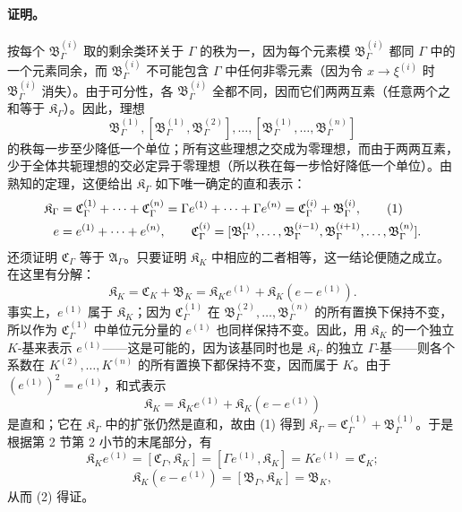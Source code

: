 \paragraph{证明。}
按每个 $\mathfrak B_\Gamma^{(i)}$ 取的剩余类环关于 $\Gamma$ 的秩为一，因为每个元素模 $\mathfrak B_\Gamma^{(i)}$ 都同 $\Gamma$ 中的一个元素同余，而 $\mathfrak B_\Gamma^{(i)}$ 不可能包含 $\Gamma$ 中任何非零元素（因为令 $x\to\xi^{(i)}$ 时 $\mathfrak B_\Gamma^{(i)}$ 消失）。由于可分性，各 $\mathfrak B_\Gamma^{(i)}$ 全都不同，因而它们两两互素（任意两个之和等于 $\mathfrak K_\Gamma$）。因此，理想
\[
\mathfrak B_\Gamma^{(1)},
[\mathfrak B_\Gamma^{(1)},\mathfrak B_\Gamma^{(2)}],\ldots,
[\mathfrak B_\Gamma^{(1)},\ldots,\mathfrak B_\Gamma^{(n)}]
\]
的秩每一步至少降低一个单位；所有这些理想之交成为零理想，而由于两两互素，少于全体共轭理想的交必定异于零理想（所以秩在每一步恰好降低一个单位）。由熟知的定理，这便给出 $\mathfrak K_\Gamma$ 如下唯一确定的直和表示：
\begin{align}
\mathfrak K_\Gamma
&=\mathfrak C_\Gamma^{(1)}+\cdots+\mathfrak C_\Gamma^{(n)}
=\Gamma e^{(1)}+\cdots+\Gamma e^{(n)}
=\mathfrak C_\Gamma^{(i)}+\mathfrak B_\Gamma^{(i)}, \tag{1}\\
e&=e^{(1)}+\cdots+e^{(n)},\qquad
\mathfrak C_\Gamma^{(i)}=
[\mathfrak B_\Gamma^{(1)},\ldots,\mathfrak B_\Gamma^{(i-1)},
\mathfrak B_\Gamma^{(i+1)},\ldots,\mathfrak B_\Gamma^{(n)}].\notag
\end{align}
还须证明 $\mathfrak C_\Gamma$ 等于 $\mathfrak A_\Gamma$。只要证明 $\mathfrak K_K$ 中相应的二者相等，这一结论便随之成立。在这里有分解：
\begin{equation}
\mathfrak K_K=\mathfrak C_K+\mathfrak B_K
=\mathfrak K_K e^{(1)}+\mathfrak K_K(e-e^{(1)}). \tag{2}
\end{equation}
事实上，$e^{(1)}$ 属于 $\mathfrak K_K$；因为 $\mathfrak C_\Gamma^{(1)}$ 在 $\mathfrak B_\Gamma^{(2)},\ldots,\mathfrak B_\Gamma^{(n)}$ 的所有置换下保持不变，所以作为 $\mathfrak C_\Gamma^{(1)}$ 中单位元分量的 $e^{(1)}$ 也同样保持不变。因此，用 $\mathfrak K_K$ 的一个独立 $K$-基来表示 $e^{(1)}$——这是可能的，因为该基同时也是 $\mathfrak K_\Gamma$ 的独立 $\Gamma$-基——则各个系数在 $K^{(2)},\ldots,K^{(n)}$ 的所有置换下都保持不变，因而属于 $K$。由于 $(e^{(1)})^2=e^{(1)}$，和式表示
\[
\mathfrak K_K=\mathfrak K_K e^{(1)}+\mathfrak K_K(e-e^{(1)})
\]
是直和；它在 $\mathfrak K_\Gamma$ 中的扩张仍然是直和，故由 (1) 得到 $\mathfrak K_\Gamma=\mathfrak C_\Gamma^{(1)}+\mathfrak B_\Gamma^{(1)}$。于是根据第 2 节第 2 小节的末尾部分，有
\[
\mathfrak K_K e^{(1)}=[\mathfrak C_\Gamma,\mathfrak K_K]
=[\Gamma e^{(1)},\mathfrak K_K]=Ke^{(1)}=\mathfrak C_K;
\]
\[
\mathfrak K_K(e-e^{(1)})=[\mathfrak B_\Gamma,\mathfrak K_K]=\mathfrak B_K,
\]
从而 (2) 得证。

